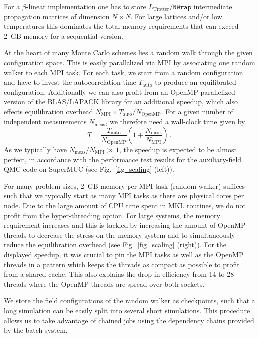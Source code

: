 For a $\beta$-linear implementation one has to store $L_{\text{Trotter}}/\texttt{NWrap}$ intermediate propagation matrices of dimension $N\times N$. For large lattices and/or low temperatures this dominates the total memory requirements that can exceed 2~GB memory for a sequential version.

At the heart of many Monte Carlo schemes lies a random walk through the given configuration space. This is easily parallalized via MPI by associating one random walker to each MPI task. For each task, we start from a random configuration and have to invest the autocorrelation time $T_\mathrm{auto}$ to produce an equilibrated configuration.
Additionally we can also profit from an OpenMP parallelized version of the BLAS/LAPACK library for an additional speedup, which also effects equilibration overhead $N_\text{MPI}\times T_\text{auto} / N_\text{OpenMP}$. For a given number of independent measurements  $N_\text{meas}$, we  therefore need a wall-clock time given by
\begin{equation}\label{eqn:scaling}
T  =  \frac{T_\text{auto}}{N_\text{OpenMP}} \left( 1   +    \frac{N_\text{meas}}{N_\text{MPI}}  \right) \,.
\end{equation}
As we typically have $ N_\text{meas}/N_\text{MPI} \gg 1 $, 
the speedup is expected to be almost perfect, in accordance with
the performance test results for the auxiliary-field
QMC code on SuperMUC (see Fig.~\ref{fig_scaling} (left)).

For many problem sizes, 2~GB memory per MPI task (random walker) suffices such that we typically start as many MPI tasks as there are physical cores per node. Due to the large amount of CPU time spent in MKL routines, we do not profit from the hyper-threading option. For large systems, the memory requirement increases and this is tackled by increasing the amount of OpenMP threads to decrease the stress on the memory system and to simultaneously reduce the equilibration overhead (see Fig.~\ref{fig_scaling} (right)). For the displayed speedup, it was crucial to pin the MPI tasks as well as the OpenMP threads in a pattern which keeps the threads as compact as possible to profit from a shared cache. This also explains the drop in efficiency from 14 to 28 threads where the OpenMP threads are spread over both sockets. 

We store the field configurations of the random walker as checkpoints, such that a long simulation can be easily split into several short simulations. This procedure allows us to take advantage of chained jobs using the dependency chains provided by the batch system.

